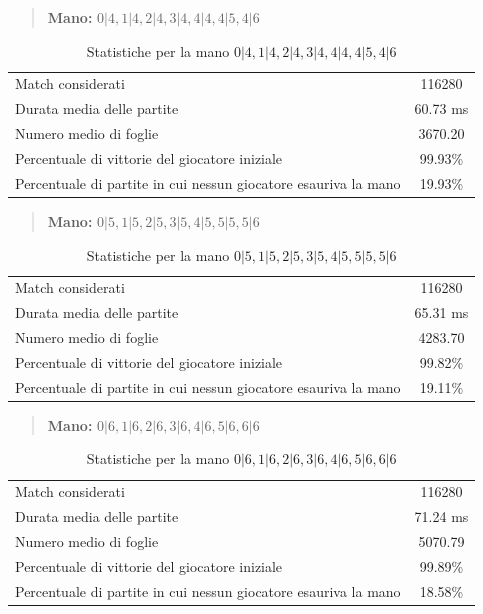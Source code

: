 \documentclass[a4paper,12pt]{report}
\begin{document}
\begin{quote}
    \textbf{Mano:} \(0|4, 1|4, 2|4, 3|4, 4|4, 4|5, 4|6\)
\end{quote}

\begin{table}[h!]
    \centering
    \begin{tabular}{|l|c|}
        \hline
        Match considerati & 116280 \\
        Durata media delle partite &  60.73 ms \\
        Numero medio di foglie &  3670.20 \\
        Percentuale di vittorie del giocatore iniziale & 99.93\% \\
        Percentuale di partite in cui nessun giocatore esauriva la mano &  19.93\% \\
        \hline
    \end{tabular}
    \caption{Statistiche per la mano \(0|4, 1|4, 2|4, 3|4, 4|4, 4|5, 4|6\)}
    \label{tab:stats_tutti_4}
\end{table}


\begin{quote}
    \textbf{Mano:} \(0|5, 1|5, 2|5, 3|5, 4|5, 5|5, 5|6\)
\end{quote}

\begin{table}[h!]
    \centering
    \begin{tabular}{|l|c|}
        \hline
        Match considerati & 116280 \\
        Durata media delle partite &  65.31 ms \\
        Numero medio di foglie &   4283.70 \\
        Percentuale di vittorie del giocatore iniziale & 99.82\% \\
        Percentuale di partite in cui nessun giocatore esauriva la mano &  19.11\% \\
        \hline
    \end{tabular}
    \caption{Statistiche per la mano \(0|5, 1|5, 2|5, 3|5, 4|5, 5|5, 5|6\)}
    \label{tab:stats_tutti_5}
\end{table}


\begin{quote}
    \textbf{Mano:} \(0|6, 1|6, 2|6, 3|6, 4|6, 5|6, 6|6\)
\end{quote}

\begin{table}[h!]
    \centering
    \begin{tabular}{|l|c|}
        \hline
        Match considerati & 116280 \\
        Durata media delle partite &  71.24 ms \\
        Numero medio di foglie &  5070.79 \\
        Percentuale di vittorie del giocatore iniziale & 99.89\% \\
        Percentuale di partite in cui nessun giocatore esauriva la mano &  18.58\% \\
        \hline
    \end{tabular}
    \caption{Statistiche per la mano \(0|6, 1|6, 2|6, 3|6, 4|6, 5|6, 6|6\)}
    \label{tab:stats_tutti_6}
\end{table}
\end{document}
